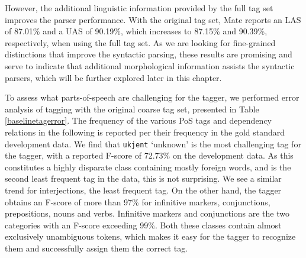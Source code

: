 \documentclass[a4paper,12pt,english]{book}
\begin{document}
However, the additional linguistic information provided by the full tag set
improves the parser performance. With the original tag set, Mate reports an LAS
of 87.01\% and a UAS of 90.19\%, which increases to 87.15\% and 90.39\%,
respectively, when using the full tag set. As we are looking for fine-grained
distinctions that improve the syntactic parsing, these results are promising
and serve to indicate that additional morphological information assists the
syntactic parsers, which will be further explored later in this chapter.

To assess what parts-of-speech are challenging for the tagger, we performed
error analysis of tagging with the original coarse tag set, presented in Table
\ref{baselinetagerror}. The frequency of the various PoS tags and dependency
relations in the following is reported per their frequency in the gold standard
development data.  We find that \texttt{ukjent} `unknown' is the most
challenging tag for the tagger, with a reported F-score of 72.73\% on the
development data. As this constitutes a highly disparate class containing
mostly foreign words, and is the second least frequent tag in the data, this is
not surprising. We see a similar trend for interjections, the least frequent
tag. On the other hand, the tagger obtains an F-score of more than 97\% for
infinitive markers, conjunctions, prepositions, nouns and verbs. Infinitive
markers and conjunctions are the two categories with an F-score exceeding 99\%.
Both these classes contain almost exclusively unambiguous tokens, which makes
it easy for the tagger to recognize them and successfully assign them the
correct tag.
\end{document}
